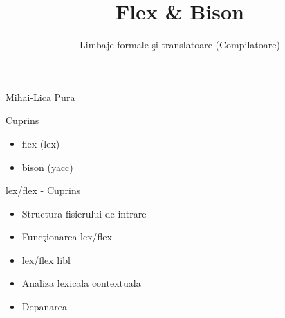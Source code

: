 \documentclass[pdf]{beamer}
\title{Flex \& Bison}
\subtitle{Limbaje formale şi translatoare (Compilatoare)}
\begin{document}
\begin{frame}
	\titlepage
	
\begin{flushright}
Mihai-Lica Pura\\
\end{flushright}

\end{frame}


\begin{frame}{Cuprins}
\begin{itemize}
\item
flex (lex)

\item
bison (yacc)

\end{itemize}
\end{frame}



\begin{frame}{lex/flex - Cuprins}
\begin{itemize}
\item
Structura fisierului de intrare

\item
Funcţionarea lex/flex

\item
lex/flex libl

\item
Analiza lexicala contextuala

\item
Depanarea

\end{itemize}
\end{frame}
\end{document}

